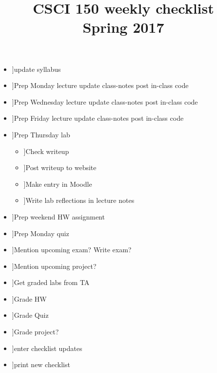 \documentclass{article}
\title{CSCI 150 weekly checklist \\ {\small Spring 2017}}
\date{}
\newcommand{\cbox}{\framebox[1em]{\phantom{x}}}
\newcommand{\ci}{\item[\cbox]}
\newcommand{\also}{\cbox \hspace{1ex}}
\begin{document}
\maketitle
\thispagestyle{empty}

\begin{itemize}
\ci update syllabus
\ci Prep Monday lecture \also update class-notes \also post in-class code
\ci Prep Wednesday lecture \also update class-notes \also post in-class code
\ci Prep Friday lecture \also update class-notes \also post in-class code \\

\ci Prep Thursday lab
\begin{itemize}
\ci Check writeup
\ci Post writeup to website
\ci Make entry in Moodle
\ci Write lab reflections in lecture notes
\end{itemize}
\ci Prep weekend HW assignment \\
\ci Prep Monday quiz

\ci Mention upcoming exam? \also Write exam?
\ci Mention upcoming project? \\

\ci Get graded labs from TA
\ci Grade HW
\ci Grade Quiz
\ci Grade project? \\

\ci enter checklist updates
\ci print new checklist
\end{itemize}
\end{document}
